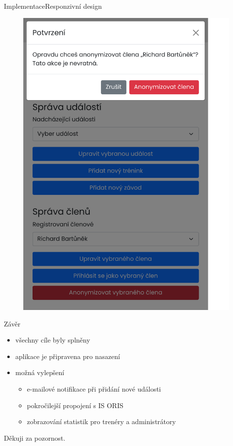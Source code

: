 \documentclass[aspectratio=169]{beamer}
\begin{document}
\begin{frame}{Implementace}{Responzivní design}
\begin{figure}[h]
\begin{minipage}[b]{0.3\linewidth}
            \includegraphics[width=0.9\linewidth, cfbox=confirm-gray 0.5pt 0pt]{images/confirm-dialog.pdf}
        \end{minipage}
        \hfill
    \end{figure}
\end{frame}

\begin{frame}{Závěr}
    \begin{itemize}
        \item všechny cíle byly splněny
        \item aplikace je připravena pro nasazení
        \item možná vylepšení
        \begin{itemize}
            \item e-mailové notifikace při přidání nové události
            \item pokročilejší propojení s IS ORIS
            \item zobrazování statistik pro trenéry a administrátory
        \end{itemize}
    \end{itemize}
\end{frame}

\begin{frame}
    Děkuji za pozornost.
\end{frame}

\appendix

\end{document}

